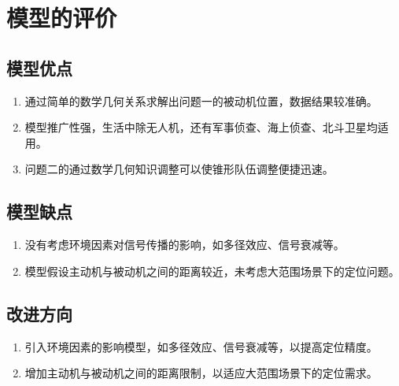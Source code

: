\documentclass[withoutpreface,bwprint]{cumcmthesis} %
\begin{document}
\section{模型的评价}
\subsection{模型优点}
\begin{enumerate}
    \item 通过简单的数学几何关系求解出问题一的被动机位置，数据结果较准确。
    \item 模型推广性强，生活中除无人机，还有军事侦查、海上侦查、北斗卫星均适用。
    \item 问题二的通过数学几何知识调整可以使锥形队伍调整便捷迅速。
\end{enumerate}

\subsection{模型缺点}
\begin{enumerate}
    \item 没有考虑环境因素对信号传播的影响，如多径效应、信号衰减等。
    \item 模型假设主动机与被动机之间的距离较近，未考虑大范围场景下的定位问题。
\end{enumerate}

\subsection{改进方向}
\begin{enumerate}
    \item 引入环境因素的影响模型，如多径效应、信号衰减等，以提高定位精度。
    \item 增加主动机与被动机之间的距离限制，以适应大范围场景下的定位需求。
\end{enumerate}



\end{document}
